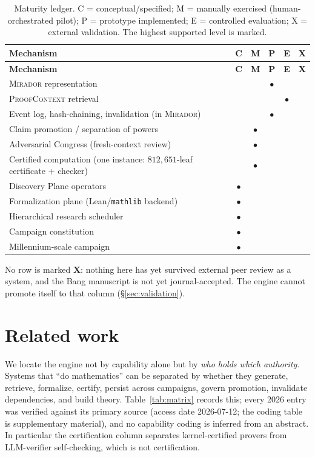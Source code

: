 \documentclass[11pt]{amsart}
\theoremstyle{definition}
\theoremstyle{remark}
\newcommand{\mirador}{\textsc{Mirador}}
\newcommand{\pc}{\textsc{ProofContext}}
\newcommand{\yes}{$\bullet$}
\begin{document}
{\footnotesize
\begin{longtable}{@{}p{}ccccc@{}}
\caption{Maturity ledger. C = conceptual/specified; M = manually exercised
(human-orchestrated pilot); P = prototype implemented; E = controlled
evaluation; X = external validation. The highest supported level is marked.}
\label{tab:maturity}\\
\toprule
\textbf{Mechanism} & \textbf{C} & \textbf{M} & \textbf{P} & \textbf{E} &
\textbf{X}\\
\midrule
\endfirsthead
\toprule
\textbf{Mechanism} & \textbf{C} & \textbf{M} & \textbf{P} & \textbf{E} &
\textbf{X}\\ \midrule
\endhead
\mirador{} representation~\cite{lucius2026mirador} & & & \yes & & \\
\pc{} retrieval~\cite{lucius2026proofcontext} & & & & \yes & \\
Event log, hash-chaining, invalidation (in \mirador{}) & & & \yes & & \\
Claim promotion / separation of powers & & \yes & & & \\
Adversarial Congress (fresh-context review) & & \yes & & & \\
Certified computation (one instance: $812{,}651$-leaf certificate + checker) & &
\yes & & & \\
Discovery Plane operators & \yes & & & & \\
Formalization plane (Lean/\texttt{mathlib} backend) & \yes & & & & \\
Hierarchical research scheduler & \yes & & & & \\
Campaign constitution & \yes & & & & \\
Millennium-scale campaign & \yes & & & & \\
\bottomrule
\end{longtable}
}

\noindent No row is marked \textbf{X}: nothing here has yet survived external
peer review as a system, and the Bang manuscript is not yet journal-accepted.
The engine cannot promote itself to that column (\S\ref{sec:validation}).

\section{Related work}\label{sec:related}

We locate the engine not by capability alone but by \emph{who holds which
authority}. Systems that ``do mathematics'' can be separated by whether they
generate, retrieve, formalize, certify, persist across campaigns, govern
promotion, invalidate dependencies, and build theory. Table~\ref{tab:matrix}
records this; every 2026 entry was verified against its primary source (access date 2026-07-12; the coding table is
supplementary material), and no capability coding is inferred
from an abstract. In particular the certification column separates
kernel-certified provers from LLM-verifier self-checking, which is not
certification.
\end{document}
